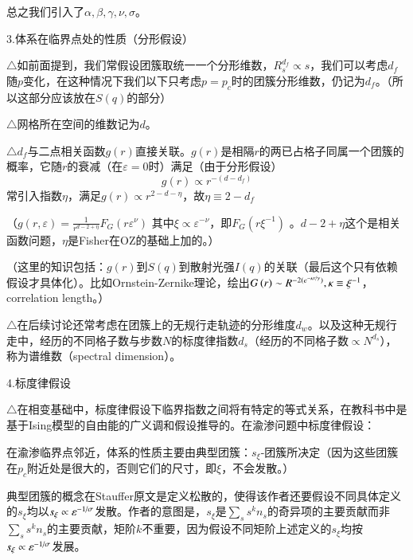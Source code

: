 \documentclass{article} %
\begin{document}
\noindent 总之我们引入了$\alpha ,\beta ,\gamma ,\nu ,\sigma $。

\noindent 3.体系在临界点处的性质（分形假设）

\noindent $\mathrm{\triangle}$如前面提到，我们常假设团簇取统一一个分形维数，$R_{s}^{d_{f} } \propto s$，我们可以考虑$d_{f} $随$p$变化，在这种情况下我们以下只考虑$p=p_{c} $时的团簇分形维数，仍记为$d_{f} $。（所以这部分应该放在$S\left(q\right)$的部分）

\noindent $\mathrm{\triangle}$网格所在空间的维数记为$d$。

\noindent $\mathrm{\triangle}$$d_{f} $与二点相关函数$g\left(r\right)$直接关联。$g\left(r\right)$是相隔$r$的两已占格子同属一个团簇的概率，它随$r$的衰减（在$\varepsilon =0$时）满足（由于分形假设）
\[g\left(r\right)\propto r^{-(d-d_{f} )} \] 
常引入指数$\eta $，满足$g\left(r\right)\propto r^{2-d-\eta } $，故$\eta \equiv 2-d_{f} $ 

\noindent （$g\left(r,\varepsilon \right)=\frac{1}{r^{d-2+\eta } } F_{G} \left(r\varepsilon ^{\nu } \right)$ 其中$\xi \propto \varepsilon ^{-\nu } $，即$F_{G} \left(r\xi ^{-1} \right)$ 。$d-2+\eta $这个是相关函数问题，$\eta $是Fisher在OZ的基础上加的。）

\noindent （这里的知识包括：$g\left(r\right)$到$S\left(q\right)$到散射光强$I\left(q\right)$的关联（最后这个只有依赖假设才具体化）。比如Ornstein-Zernike理论，绘出$G\left(r\right)\sim R^{-2(e^{{-\kappa r\mathord{\left/ {\vphantom {-\kappa r \gamma }} \right. \kern-\nulldelimiterspace} \gamma } } )} ,\kappa \equiv \xi ^{-1} $，correlation length。）

\noindent $\mathrm{\triangle}$在后续讨论还常考虑在团簇上的无规行走轨迹的分形维度$d_{w} $。以及这种无规行走中，经历的不同格子数与步数$N$的标度律指数$d_{s} $（经历的不同格子数$\propto N^{d_{s} } $），称为谱维数（spectral dimension）。

\noindent 4.标度律假设

\noindent $\mathrm{\triangle}$在相变基础中，标度律假设下临界指数之间将有特定的等式关系，在教科书中是基于Ising模型的自由能的广义调和假设推导的。在渝渗问题中标度律假设：

\noindent 在渝渗临界点邻近，体系的性质主要由典型团簇：$s_{\xi } $-团簇所决定（因为这些团簇在$p_{c} $附近处是很大的，否则它们的尺寸，即$\xi $，不会发散。）

\noindent 典型团簇的概念在Stauffer原文是定义松散的，使得该作者还要假设不同具体定义的$s_{\xi } $均以$s_{\xi } \propto \varepsilon ^{{-1\mathord{\left/ {\vphantom {-1 \sigma }} \right. \kern-\nulldelimiterspace} \sigma } } $发散。作者的意图是，$s_{\xi } $是$\sum _{s}s^{k} n_{s}  $的奇异项的主要贡献而非$\sum _{s}s^{k} n_{s}  $的主要贡献，矩阶$k$不重要，因为假设不同矩阶上述定义的$s_{\xi } $均按$s_{\xi } \propto \varepsilon ^{{-1\mathord{\left/ {\vphantom {-1 \sigma }} \right. \kern-\nulldelimiterspace} \sigma } } $发展。
\end{document}
